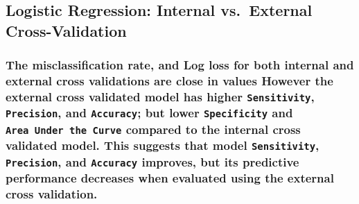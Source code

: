 \documentclass[american,]{article}
\begin{document}
\hypertarget{logistic-regression-internal-vs.-external-cross-validation}{%
\subsection{\texorpdfstring{\textbf{Logistic Regression: Internal vs.~External Cross-Validation}}{Logistic Regression: Internal vs.~External Cross-Validation}}\label{logistic-regression-internal-vs.-external-cross-validation}}

\hypertarget{the-misclassification-rate-and-log-loss-for-both-internal-and-external-cross-validations-are-close-in-values-however-the-external-cross-validated-model-has-higher-sensitivity-precision-and-accuracy-but-lower-specificity-and-area-under-the-curve-compared-to-the-internal-cross-validated-model.-this-suggests-that-model-sensitivity-precision-and-accuracy-improves-but-its-predictive-performance-decreases-when-evaluated-using-the-external-cross-validation.}{%
\subsubsection{\texorpdfstring{The misclassification rate, and Log loss for both internal and external cross validations are close in values However the external cross validated model has higher \texttt{Sensitivity}, \texttt{Precision}, and \texttt{Accuracy}; but lower \texttt{Specificity} and \texttt{Area\ Under\ the\ Curve} compared to the internal cross validated model. This suggests that model \texttt{Sensitivity}, \texttt{Precision}, and \texttt{Accuracy} improves, but its predictive performance decreases when evaluated using the external cross validation.}{The misclassification rate, and Log loss for both internal and external cross validations are close in values However the external cross validated model has higher Sensitivity, Precision, and Accuracy; but lower Specificity and Area Under the Curve compared to the internal cross validated model. This suggests that model Sensitivity, Precision, and Accuracy improves, but its predictive performance decreases when evaluated using the external cross validation.}}\label{the-misclassification-rate-and-log-loss-for-both-internal-and-external-cross-validations-are-close-in-values-however-the-external-cross-validated-model-has-higher-sensitivity-precision-and-accuracy-but-lower-specificity-and-area-under-the-curve-compared-to-the-internal-cross-validated-model.-this-suggests-that-model-sensitivity-precision-and-accuracy-improves-but-its-predictive-performance-decreases-when-evaluated-using-the-external-cross-validation.}}
\end{document}
